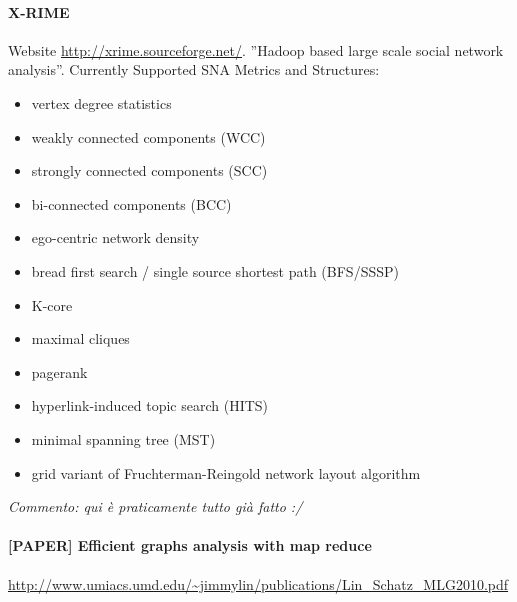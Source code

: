 \documentclass[10pt,a4paper]{article}
\begin{document}
\paragraph{X-RIME} Website \url{http://xrime.sourceforge.net/}. ''Hadoop based large scale social network analysis''.
Currently Supported SNA Metrics and Structures:
\begin{itemize}
\item vertex degree statistics
   \item  weakly connected components (WCC)
   \item  strongly connected components (SCC)
   \item  bi-connected components (BCC)
    \item ego-centric network density
    \item bread first search / single source shortest path (BFS/SSSP)
    \item K-core
    \item maximal cliques
    \item pagerank
    \item hyperlink-induced topic search (HITS)
    \item minimal spanning tree (MST)
    \item grid variant of Fruchterman-Reingold network layout algorithm
\end{itemize}

\textit{Commento: qui è praticamente tutto già fatto :/}

\paragraph{[PAPER] Efficient graphs analysis with map reduce} \url{http://www.umiacs.umd.edu/~jimmylin/publications/Lin_Schatz_MLG2010.pdf}
\end{document}
